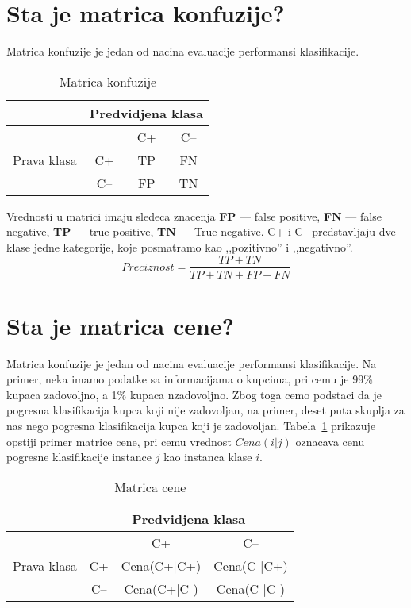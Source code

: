\documentclass[a4paper]{article}
\begin{document}
\section{Sta je matrica konfuzije?}
Matrica konfuzije je jedan od nacina evaluacije performansi klasifikacije.
\begin{table}[htbp]
\centering
\begin{tabular}{|c|c|c|c|}
    \hline
    & \multicolumn{3}{|c|}{Predvidjena klasa} \\ \hline
    \multirow{ 3}{*}{Prava klasa} & & C+ & C-- \\ 
    & C+ & TP & FN \\ 
    & C-- & FP & TN \\ \hline
\end{tabular}
\caption{Matrica konfuzije}
\end{table}
Vrednosti u matrici imaju sledeca znacenja \textbf{FP} --- false positive, \textbf{FN} --- false
negative, \textbf{TP} --- true positive, \textbf{TN} --- True negative. C+ i C-- predstavljaju dve
klase jedne kategorije, koje posmatramo kao ,,pozitivno'' i ,,negativno''.
\[
    Preciznost = \dfrac{TP + TN}{TP + TN + FP + FN}
\]
\section{Sta je matrica cene?}
Matrica konfuzije je jedan od nacina evaluacije performansi klasifikacije. Na primer, neka imamo
podatke sa informacijama o kupcima, pri cemu je 99\% kupaca zadovoljno, a 1\% kupaca nzadovoljno.
Zbog toga cemo podstaci da je pogresna klasifikacija kupca koji nije zadovoljan, na primer, deset
puta skuplja za nas nego pogresna klasifikacija kupca koji je zadovoljan. Tabela~\ref{matrica_cene}
prikazuje opstiji primer matrice cene, pri cemu vrednost \(Cena(i|j)\) oznacava cenu pogresne
klasifikacije instance \(j\) kao instanca klase \(i\).
\begin{table}[htbp]
\centering
\begin{tabular}{|c|c|c|c|}
    \hline
    & \multicolumn{3}{|c|}{Predvidjena klasa} \\ \hline
    \multirow{ 3}{*}{Prava klasa} & & C+ & C-- \\ 
    & C+ & Cena(C+|C+) & Cena(C-|C+) \\ 
    & C-- & Cena(C+|C-) & Cena(C-|C-)\\ \hline
\end{tabular}
\caption{Matrica cene}
\label{matrica_cene}
\end{table}
\end{document}
